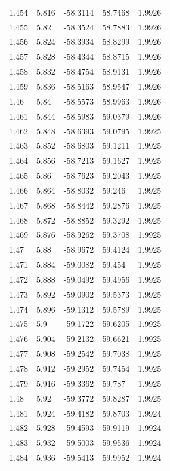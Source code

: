 \begin{tabular}{lllll}
1.454 & 5.816 & -58.3114 & 58.7468 & 1.9926 \\
1.455 & 5.82 & -58.3524 & 58.7883 & 1.9926 \\
1.456 & 5.824 & -58.3934 & 58.8299 & 1.9926 \\
1.457 & 5.828 & -58.4344 & 58.8715 & 1.9926 \\
1.458 & 5.832 & -58.4754 & 58.9131 & 1.9926 \\
1.459 & 5.836 & -58.5163 & 58.9547 & 1.9926 \\
1.46 & 5.84 & -58.5573 & 58.9963 & 1.9926 \\
1.461 & 5.844 & -58.5983 & 59.0379 & 1.9926 \\
1.462 & 5.848 & -58.6393 & 59.0795 & 1.9925 \\
1.463 & 5.852 & -58.6803 & 59.1211 & 1.9925 \\
1.464 & 5.856 & -58.7213 & 59.1627 & 1.9925 \\
1.465 & 5.86 & -58.7623 & 59.2043 & 1.9925 \\
1.466 & 5.864 & -58.8032 & 59.246 & 1.9925 \\
1.467 & 5.868 & -58.8442 & 59.2876 & 1.9925 \\
1.468 & 5.872 & -58.8852 & 59.3292 & 1.9925 \\
1.469 & 5.876 & -58.9262 & 59.3708 & 1.9925 \\
1.47 & 5.88 & -58.9672 & 59.4124 & 1.9925 \\
1.471 & 5.884 & -59.0082 & 59.454 & 1.9925 \\
1.472 & 5.888 & -59.0492 & 59.4956 & 1.9925 \\
1.473 & 5.892 & -59.0902 & 59.5373 & 1.9925 \\
1.474 & 5.896 & -59.1312 & 59.5789 & 1.9925 \\
1.475 & 5.9 & -59.1722 & 59.6205 & 1.9925 \\
1.476 & 5.904 & -59.2132 & 59.6621 & 1.9925 \\
1.477 & 5.908 & -59.2542 & 59.7038 & 1.9925 \\
1.478 & 5.912 & -59.2952 & 59.7454 & 1.9925 \\
1.479 & 5.916 & -59.3362 & 59.787 & 1.9925 \\
1.48 & 5.92 & -59.3772 & 59.8287 & 1.9925 \\
1.481 & 5.924 & -59.4182 & 59.8703 & 1.9924 \\
1.482 & 5.928 & -59.4593 & 59.9119 & 1.9924 \\
1.483 & 5.932 & -59.5003 & 59.9536 & 1.9924 \\
1.484 & 5.936 & -59.5413 & 59.9952 & 1.9924 \\

\end{tabular}
